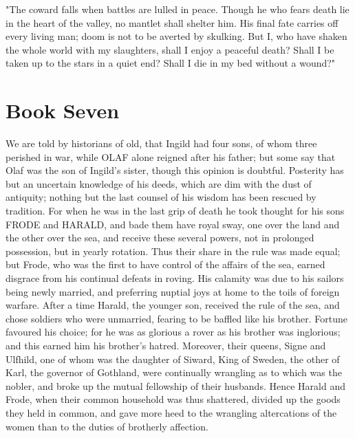 \documentclass[10pt,a4paper]{report}
\begin{document}
"The coward falls when battles are lulled in peace. Though he who fears death lie in the heart of the valley, no mantlet shall shelter him. His final fate carries off every living man; doom is not to be averted by skulking. But I, who have shaken the whole world with my slaughters, shall I enjoy a peaceful death? Shall I be taken up to the stars in a quiet end? Shall I die in my bed without a wound?"\\

\chapter{Book Seven}

We are told by historians of old, that Ingild had four sons, of whom three perished in war, while OLAF alone reigned after his father; but some say that Olaf was the son of Ingild's sister, though this opinion is doubtful. Posterity has but an uncertain knowledge of his deeds, which are dim with the dust of antiquity; nothing but the last counsel of his wisdom has been rescued by tradition. For when he was in the last grip of death he took thought for his sons FRODE and HARALD, and bade them have royal sway, one over the land and the other over the sea, and receive these several powers, not in prolonged possession, but in yearly rotation. Thus their share in the rule was made equal; but Frode, who was the first to have control of the affairs of the sea, earned disgrace from his continual defeats in roving. His calamity was due to his sailors being newly married, and preferring nuptial joys at home to the toils of foreign warfare. After a time Harald, the younger son, received the rule of the sea, and chose soldiers who were unmarried, fearing to be baffled like his brother. Fortune favoured his choice; for he was as glorious a rover as his brother was inglorious; and this earned him his brother's hatred. Moreover, their queens, Signe and Ulfhild, one of whom was the daughter of Siward, King of Sweden, the other of Karl, the governor of Gothland, were continually wrangling as to which was the nobler, and broke up the mutual fellowship of their husbands. Hence Harald and Frode, when their common household was thus shattered, divided up the goods they held in common, and gave more heed to the wrangling altercations of the women than to the duties of brotherly affection.\\
\end{document}
